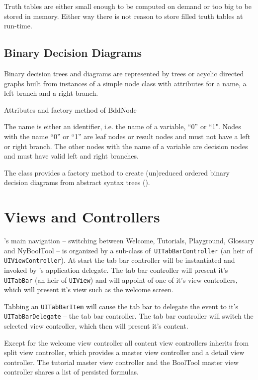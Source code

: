 Truth tables are either small enough to be computed on demand or too big to be stored in memory.
Either way there is not reason to store filled truth tables at run-time.

\subsection{Binary Decision Diagrams}

Binary decision trees and diagrams are represented by trees 
or acyclic directed graphs built from instances of a simple node class
 with attributes for a name, a left branch and a right branch. 
\begin{table}[htdp]
\begin{center}
\caption{Attributes and factory method of BddNode}
\label{fig:BddNode}
\end{center}
\end{table}
The name is either an identifier, i.e. the name of a variable, “0” or “1". 
Nodes with the name “0” or “1” are leaf nodes or result nodes
and must not have a left or right branch.
The other nodes with the name of a variable are decision nodes 
and must have valid left and right branches. 

The class provides a factory method to create 
(un)reduced ordered binary decision diagrams from abstract syntax trees
().

\newpage\section{Views and Controllers}

\Nyaya's main navigation – switching between Welcome, Tutorials, Playground, Glossary and NyBoolTool – 
is organized by a sub-class of\verb+ UITabBarController+ (an heir of \verb+UIViewController+). 
At start the tab bar controller will be instantiated and invoked by \Nyaya's application delegate. 
The tab bar controller will present it's \verb+UITabBar+ (an heir of \verb+UIView+)
and will appoint of one of it's view controllers, which will present it's view such as the welcome screen.

Tabbing an \verb+UITabBarItem+ will cause the tab bar to delegate the event to it's \verb+UITabBarDelegate+ – the tab bar controller.
The tab bar controller will switch the selected view controller, which then will present it's content.

Except for the welcome view controller 
all content view controllers inherits from split view controller,
which provides a master view controller and a detail view controller.
The tutorial master view controller and the BoolTool master view controller shares a list of persisted formulas.

